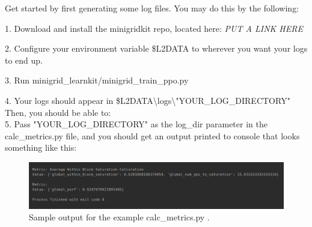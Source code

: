 Get started by first generating some log files. You may do this by the following:

1. Download and install the minigridkit repo, located here: \textit{PUT A LINK HERE}

2. Configure your environment variable \$L2DATA to wherever you want your logs to end up.

3. Run minigrid\_learnkit/minigrid\_train\_ppo.py

4. Your logs should appear in \$L2DATA\textbackslash logs\textbackslash  "YOUR\_LOG\_DIRECTORY"\\[0.1in]


Then, you should be able to:\\[0.1in]


5. Pass "YOUR\_LOG\_DIRECTORY" as the log\_dir parameter in the calc\_metrics.py file, and you should get an output printed to console that looks something like this: 


\begin{figure}[h]
	\centering
	\includegraphics[width=0.85\columnwidth]{sections/figs/calc_metrics_output.png}
	\caption{Sample output for the example calc\_metrics.py .}
	\label{fig:calcmetricsoutput}
\end{figure}
